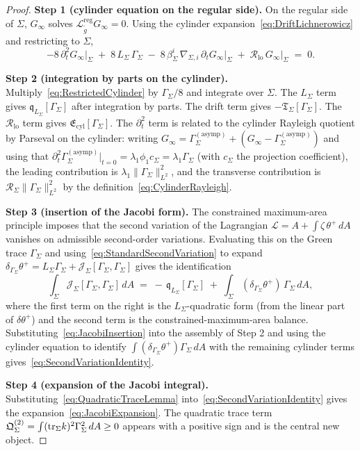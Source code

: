 \begin{proof}
\textbf{Step 1 (cylinder equation on the regular side).}
On the regular side of $\Sigma$, $G_\infty$ solves $\mathcal L_{\widetilde g}^{\mathrm{reg}}G_\infty=0$. Using the cylinder expansion~\eqref{eq:DriftLichnerowicz} and restricting to $\Sigma$,
\begin{equation}\label{eq:RestrictedCylinder}
    -8\,\partial_t^2 G_\infty\big|_\Sigma
    \;+\;8\,L_\Sigma\,\Gamma_\Sigma
    \;-\;8\,\beta_\Sigma^i\,\nabla_{\!\Sigma,i}\,\partial_t G_\infty\big|_\Sigma
    \;+\;\mathcal R_{\mathrm{lo}}\,G_\infty\big|_\Sigma
    \;=\;0 .
\end{equation}

\textbf{Step 2 (integration by parts on the cylinder).}
Multiply~\eqref{eq:RestrictedCylinder} by $\Gamma_\Sigma/8$ and integrate over $\Sigma$. The $L_\Sigma$ term gives $\mathfrak q_{L_\Sigma}[\Gamma_\Sigma]$ after integration by parts. The drift term gives $-\mathfrak T_\Sigma[\Gamma_\Sigma]$. The $\mathcal R_{\mathrm{lo}}$ term gives $\mathfrak E_{\mathrm{cyl}}[\Gamma_\Sigma]$. The $\partial_t^2$ term is related to the cylinder Rayleigh quotient by Parseval on the cylinder: writing $G_\infty = \Gamma_\Sigma^{(\mathrm{asymp})} + (G_\infty - \Gamma_\Sigma^{(\mathrm{asymp})})$ and using that $\partial_t^2 \Gamma_\Sigma^{(\mathrm{asymp})}|_{t=0} = \lambda_1 \phi_1 c_\Sigma = \lambda_1 \Gamma_\Sigma$ (with $c_\Sigma$ the projection coefficient), the leading contribution is $\lambda_1 \|\Gamma_\Sigma\|_{L^2}^2$, and the transverse contribution is $\mathcal R_\Sigma \|\Gamma_\Sigma\|_{L^2}^2$ by the definition~\eqref{eq:CylinderRayleigh}.

\textbf{Step 3 (insertion of the Jacobi form).}
The constrained maximum-area principle imposes that the second variation of the Lagrangian $\mathscr L = A + \int \zeta\,\theta^+\,dA$ vanishes on admissible second-order variations. Evaluating this on the Green trace $\Gamma_\Sigma$ and using~\eqref{eq:StandardSecondVariation} to expand $\delta_{\Gamma_\Sigma}\theta^+ = L_\Sigma\Gamma_\Sigma + \mathcal J_\Sigma[\Gamma_\Sigma,\Gamma_\Sigma]$ gives the identification
\begin{equation}\label{eq:JacobiInsertion}
    \int_\Sigma \mathcal J_\Sigma[\Gamma_\Sigma,\Gamma_\Sigma]\,dA
    \;=\;
    -\,\mathfrak q_{L_\Sigma}[\Gamma_\Sigma]
    \;+\;\int_\Sigma (\delta_{\Gamma_\Sigma}\theta^+)\,\Gamma_\Sigma\,dA ,
\end{equation}
where the first term on the right is the $L_\Sigma$-quadratic form (from the linear part of $\delta\theta^+$) and the second term is the constrained-maximum-area balance. Substituting~\eqref{eq:JacobiInsertion} into the assembly of Step 2 and using the cylinder equation to identify $\int(\delta_{\Gamma_\Sigma}\theta^+)\Gamma_\Sigma\,dA$ with the remaining cylinder terms gives~\eqref{eq:SecondVariationIdentity}.

\textbf{Step 4 (expansion of the Jacobi integral).}
Substituting~\eqref{eq:QuadraticTraceLemma} into~\eqref{eq:SecondVariationIdentity} gives the expansion~\eqref{eq:JacobiExpansion}. The quadratic trace term $\mathfrak Q_\Sigma^{(2)}=\int(\mathrm{tr}_\Sigma k)^2\Gamma_\Sigma^2\,dA\ge0$ appears with a positive sign and is the central new object.
\end{proof}

